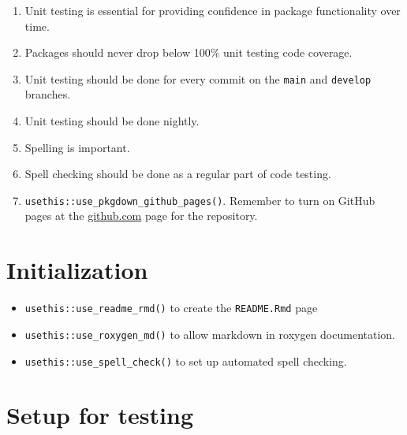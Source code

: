 \documentclass{article}
\begin{document}
\begin{enumerate}

  \item Unit testing is essential for providing confidence in package functionality over time.
  
  \item Packages should never drop below 100\% unit testing code coverage.
  
  \item Unit testing should be done for every commit on the \texttt{main} and \texttt{develop}
        branches.
		
  \item Unit testing should be done nightly.
  
  \item Spelling is important.
  
  \item Spell checking should be done as a regular part of code testing.
  
  \item \verb|usethis::use_pkgdown_github_pages()|. 
  		Remember to turn on GitHub pages at the \url{github.com} page for the repository.

\end{enumerate}


\section{Initialization}
\label{sec:initialiation}

\begin{itemize}

  \item \verb|usethis::use_readme_rmd()| to create the \verb|README.Rmd| page

  \item \verb|usethis::use_roxygen_md()| to allow markdown in roxygen documentation.
  
  \item \verb|usethis::use_spell_check()| to set up automated spell checking.

\end{itemize}


\section{Setup for testing} 
\label{sec:testing_setup}
\end{document}
